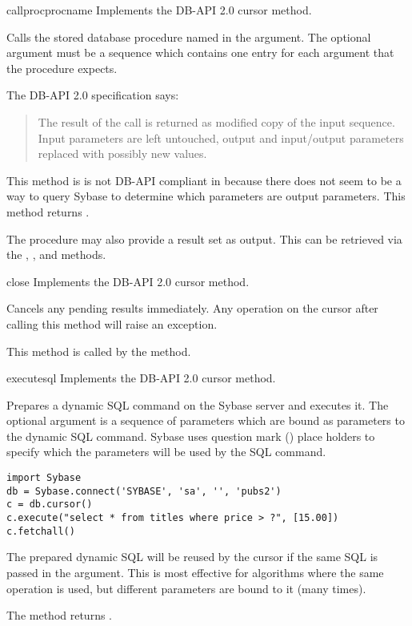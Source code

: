 \begin{methoddesc}[Cursor]{callproc}{procname }
Implements the DB-API 2.0 cursor  method.

Calls the stored database procedure named in the 
argument. The optional  argument must be a sequence
which contains one entry for each argument that the procedure expects.

The DB-API 2.0 specification says:

\begin{quote}
The result of the call is returned as modified copy of the input
sequence.  Input parameters are left untouched, output and
input/output parameters replaced with possibly new values.
\end{quote}

This method is is not DB-API compliant in because there does not seem
to be a way to query Sybase to determine which parameters are output
parameters.  This method returns .

The procedure may also provide a result set as output. This can be
retrieved via the , , and
 methods.
\end{methoddesc}

\begin{methoddesc}[Cursor]{close}{}
Implements the DB-API 2.0 cursor  method.

Cancels any pending results immediately.  Any operation on the cursor
after calling this method will raise an exception.

This method is called by the  method.
\end{methoddesc}

\begin{methoddesc}[Cursor]{execute}{sql }
Implements the DB-API 2.0 cursor  method.

Prepares a dynamic SQL command on the Sybase server and executes it.
The optional  argument is a sequence of parameters which
are bound as parameters to the dynamic SQL command.  Sybase uses
question mark () place holders to specify which the parameters
will be used by the SQL command.

\begin{verbatim}
import Sybase
db = Sybase.connect('SYBASE', 'sa', '', 'pubs2')
c = db.cursor()
c.execute("select * from titles where price > ?", [15.00])
c.fetchall()
\end{verbatim}

The prepared dynamic SQL will be reused by the cursor if the same SQL
is passed in the  argument.  This is most effective for
algorithms where the same operation is used, but different parameters
are bound to it (many times).

The method returns .
\end{methoddesc}

